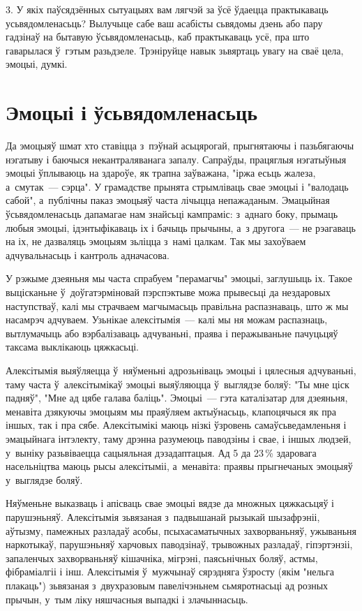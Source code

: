 3. У якіх паўсядзённых сытуацыях вам лягчэй за ўсё ўдаецца практыкаваць усьвядомленасьць? Вылучыце сабе ваш асабісты сьвядомы дзень або пару гадзінаў на бытавую ўсьвядомленасьць, каб практыкаваць усё, пра што гаварылася ў~гэтым разьдзеле. Трэніруйце навык зьвяртаць увагу на сваё цела, эмоцыі, думкі.


\section{Эмоцыі і ўсьвядомленасьць}

Да эмоцыяў шмат хто ставіцца з~пэўнай асьцярогай, прыгнятаючы і пазьбягаючы нэгатыву і баючыся некантраляванага запалу. Сапраўды, працяглыя нэгатыўныя эмоцыі ўплываюць на здароўе, як трапна заўважана, "іржа есьць жалеза, а~смутак~--- сэрца". У грамадстве прынята стрымліваць свае эмоцыі і "валодаць сабой", а~публічны паказ эмоцыяў часта лічыцца непажаданым. Эмацыйная ўсьвядомленасьць дапамагае нам знайсьці кампраміс: з~аднаго боку, прымаць любыя эмоцыі, ідэнтыфікаваць іх і бачыць прычыны, а~з другога~--- не рэагаваць на іх, не дазваляць эмоцыям зьліцца з~намі цалкам. Так мы захоўваем адчувальнасьць і кантроль адначасова.

У рэжыме дзеяньня мы часта спрабуем "перамагчы" эмоцыі, заглушыць іх. Такое выцісканьне ў~доўгатэрміновай пэрспэктыве можа прывесьці да нездаровых наступстваў, калі мы страчваем магчымасьць правільна распазнаваць, што ж мы насамрэч адчуваем. Узьнікае алексітымія~--- калі мы ня можам распазнаць, вытлумачыць або вэрбалізаваць адчуваньні, праява і перажываньне пачуцьцяў таксама выклікаюць цяжкасьці.

Алексітымія выяўляецца ў~няўменьні адрозьніваць эмоцыі і цялесныя адчуваньні, таму часта ў~алексітымікаў эмоцыі выяўляюцца ў~выглядзе боляў: "Ты мне ціск падняў", "Мне ад цябе галава баліць". Эмоцыі~--- гэта каталізатар для дзеяньня, менавіта дзякуючы эмоцыям мы праяўляем актыўнасьць, клапоцячыся як пра іншых, так і пра сябе. Алексітымікі маюць нізкі ўзровень самаўсьведамленьня і эмацыйнага інтэлекту, таму дрэнна разумеюць паводзіны і свае, і іншых людзей, у~выніку разьвіваецца сацыяльная дэзадаптацыя. Ад 5 да 23\,\% здаровага насельніцтва маюць рысы алексітыміі, а~менавіта: праявы прыгнечаных эмоцыяў у~выглядзе боляў.

Няўменьне выказваць і апісваць свае эмоцыі вядзе да множных цяжкасьцяў і парушэньняў. Алексітымія зьвязаная з~падвышанай рызыкай шызафрэніі, аўтызму, памежных разладаў асобы, псыхасаматычных захворваньняў, ужываньня наркотыкаў, парушэньняў харчовых паводзінаў, трывожных разладаў, гіпэртэнзіі, запаленчых захворваньняў кішачніка, мігрэні, паясьнічных боляў, астмы, фібраміалгіі і інш. Алексітымія ў~мужчынаў сярэдняга ўзросту (якім "нельга плакаць") зьвязаная з~двухразовым павелічэньнем сьмяротнасьці ад розных прычын, у~тым ліку няшчасныя выпадкі і злачыннасьць.

